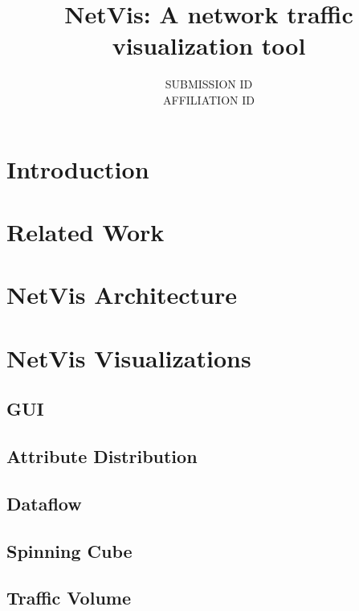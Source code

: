 \documentclass[12pt,a4paper]{article}
\title{NetVis: A network traffic visualization tool}
\author{SUBMISSION ID \\ AFFILIATION ID }
\begin{document}
\maketitle

\begin{abstract}
	
\end{abstract}

\section{Introduction}


\section{Related Work}


\section{NetVis Architecture}


\section{NetVis Visualizations}

\subsection{GUI}


\subsection{Attribute Distribution}


\subsection{Dataflow}


\subsection{Spinning Cube}


\subsection{Traffic Volume}

\end{document}
